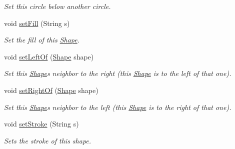 \begin{DoxyCompactItemize}
\begin{DoxyCompactList}\small\item\em Set this circle below another circle. \end{DoxyCompactList}\item 
void \hyperlink{classcom_1_1aarrelaakso_1_1drawl_1_1_shape_a2a2868c85bfbf4d2940d929950001b3d}{set\+Fill} (String s)
\begin{DoxyCompactList}\small\item\em Set the fill of this \hyperlink{classcom_1_1aarrelaakso_1_1drawl_1_1_shape}{Shape}. \end{DoxyCompactList}\item 
void \hyperlink{classcom_1_1aarrelaakso_1_1drawl_1_1_shape_aad14fa860ab74cfa90815f56cf4c3ecf}{set\+Left\+Of} (\hyperlink{classcom_1_1aarrelaakso_1_1drawl_1_1_shape}{Shape} shape)
\begin{DoxyCompactList}\small\item\em Set this \hyperlink{classcom_1_1aarrelaakso_1_1drawl_1_1_shape}{Shape}\textquotesingle{}s neighbor to the right (this \hyperlink{classcom_1_1aarrelaakso_1_1drawl_1_1_shape}{Shape} is to the left of that one). \end{DoxyCompactList}\item 
void \hyperlink{classcom_1_1aarrelaakso_1_1drawl_1_1_shape_a09e1586ce85c1d964cc3b7ce94bc5d4c}{set\+Right\+Of} (\hyperlink{classcom_1_1aarrelaakso_1_1drawl_1_1_shape}{Shape} shape)
\begin{DoxyCompactList}\small\item\em Set this \hyperlink{classcom_1_1aarrelaakso_1_1drawl_1_1_shape}{Shape}\textquotesingle{}s neighbor to the left (this \hyperlink{classcom_1_1aarrelaakso_1_1drawl_1_1_shape}{Shape} is to the right of that one). \end{DoxyCompactList}\item 
void \hyperlink{classcom_1_1aarrelaakso_1_1drawl_1_1_shape_a3930f6fe72f6c5e0c0aa4c25ffbf18ff}{set\+Stroke} (String s)
\begin{DoxyCompactList}\small\item\em Sets the stroke of this shape. \end{DoxyCompactList}\end{DoxyCompactItemize}

